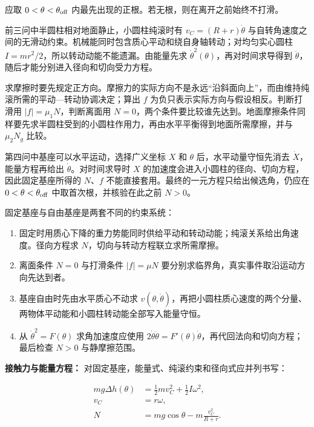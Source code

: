 \documentclass[12pt,a4paper,UTF8]{ctexart}
\newcommand{\tightlist}{\setlength{\itemsep}{0pt}\setlength{\parskip}{0pt}}
\begin{document}
应取 \(0<\theta<\theta_{\rm off}\)
内最先出现的正根。若无根，则在离开之前始终不打滑。

前三问中半圆柱相对地面静止，小圆柱纯滚时有 \(v_C=(R+r)\dot\theta\)
与自转角速度之间的无滑动约束。机械能同时包含质心平动和绕自身轴转动；对均匀实心圆柱
\(I=mr^2/2\)，所以转动动能不能遗漏。由能量先求
\(\dot\theta^2(\theta)\)，再对时间求导得到
\(\ddot\theta\)，随后才能分别进入径向和切向受力方程。

求摩擦时要先规定正方向。摩擦力的实际方向不是永远``沿斜面向上''，而由维持纯滚所需的平动---转动协调决定；算出
\(f\) 为负只表示实际方向与假设相反。判断打滑用
\(|f|=\mu_1N\)，判断离面用
\(N=0\)，两个条件要比较谁先达到。地面摩擦条件同样要先求半圆柱受到的小圆柱作用力，再由水平平衡得到地面所需摩擦，并与
\(\mu_2N_g\) 比较。

第四问中基座可以水平运动，选择广义坐标 \(X\) 和 \(\theta\)
后，水平动量守恒先消去 \(\dot X\)，能量方程再给出
\(\dot\theta\)。对时间求导时 \(X\)
的加速度会进入小圆柱的径向、切向方程，因此固定基座所得的 \(N\)、\(f\)
不能直接套用。最终的一元方程只给出候选角，仍应在
\(0<\theta<\theta_{\rm off}\) 中取首次根，并核验在此之前 \(N>0\)。

固定基座与自由基座是两套不同的约束系统：

\begin{enumerate}
\def\labelenumi{\arabic{enumi}.}
\tightlist
\item
  固定时用质心下降的重力势能同时供给平动和转动动能；纯滚关系给出角速度。径向方程求
  \(N\)，切向与转动方程联立求所需摩擦。
\item
  离面条件 \(N=0\) 与打滑条件 \(|f|=\mu N\)
  要分别求临界角，真实事件取沿运动方向先达到者。
\item
  基座自由时先由水平质心不动求
  \(v(\theta,\dot\theta)\)，再把小圆柱质心速度的两个分量、两物体平动能和小圆柱转动能全部写入能量守恒。
\item
  从 \(\dot\theta^2=F(\theta)\) 求角加速度应使用
  \(2\dot\theta\ddot\theta=F'(\theta)\dot\theta\)，再代回法向和切向方程；最后检查
  \(N>0\) 与静摩擦范围。
\end{enumerate}

\textbf{接触力与能量方程：}
对固定基座，能量式、纯滚约束和径向式应并列书写：

\[\begin{aligned}
mg\Delta h(\theta)
&=\frac12mv_C^2+\frac12I\omega^2,\\
v_C&=r\omega,\\
N&=mg\cos\theta-m\frac{v_C^2}{R+r}.
\end{aligned}\]
\end{document}
